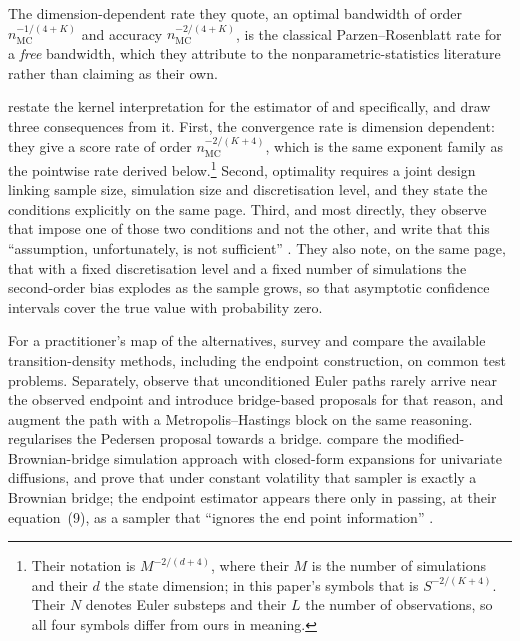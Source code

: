 \documentclass[11pt]{article}
\theoremstyle{definition}
\newcommand{\nmc}{n_{\mathrm{MC}}}
\begin{document}
The dimension-dependent rate they quote, an optimal bandwidth of order $\nmc^{-1/(4+K)}$ and accuracy $\nmc^{-2/(4+K)}$, is the classical Parzen--Rosenblatt rate for a \emph{free} bandwidth, which they attribute to the nonparametric-statistics literature rather than claiming as their own.

\citet[p.~32]{DetempleGarciaRindisbacher2006} restate the kernel interpretation for the estimator of \citet{Pedersen1995a,Pedersen1995b} and \citet{BrandtSantaClara2002} specifically, and draw three consequences from it. First, the convergence rate is dimension dependent: they give a score rate of order $\nmc^{-2/(K+4)}$, which is the same exponent family as the pointwise rate derived below.\footnote{Their notation is $M^{-2/(d+4)}$, where their $M$ is the number of simulations and their $d$ the state dimension; in this paper's symbols that is $S^{-2/(K+4)}$. Their $N$ denotes Euler substeps and their $L$ the number of observations, so all four symbols differ from ours in meaning.} Second, optimality requires a joint design linking sample size, simulation size and discretisation level, and they state the conditions explicitly on the same page. Third, and most directly, they observe that \citet{BrandtSantaClara2002} impose one of those two conditions and not the other, and write that this ``assumption, unfortunately, is not sufficient'' \citep[p.~32]{DetempleGarciaRindisbacher2006}. They also note, on the same page, that with a fixed discretisation level and a fixed number of simulations the second-order bias explodes as the sample grows, so that asymptotic confidence intervals cover the true value with probability zero.

For a practitioner's map of the alternatives, \citet{HurnJeismanLindsay2007} survey and compare the available transition-density methods, including the endpoint construction, on common test problems. Separately, \citet{DurhamGallant2002} observe that unconditioned Euler paths rarely arrive near the observed endpoint and introduce bridge-based proposals for that reason, and \citet{ElerianChibShephard2001} augment the path with a Metropolis--Hastings block on the same reasoning. \citet{Lindstrom2012} regularises the Pedersen proposal towards a bridge. \citet{StramerYan2007b} compare the modified-Brownian-bridge simulation approach with closed-form expansions for univariate diffusions, and prove that under constant volatility that sampler is exactly a Brownian bridge; the endpoint estimator appears there only in passing, at their equation~(9), as a sampler that ``ignores the end point information'' \citep[p.~677]{StramerYan2007b}.
\end{document}

